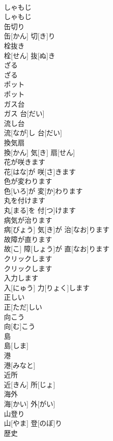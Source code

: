 \documentclass[8pt]{extreport}
\begin{document}
\begin{CJK}{UTF8}{min}
\\	しゃもじ	
\\	しゃもじ		
\\	缶切り	
\\	缶[かん] 切[き]り		
\\	栓抜き	
\\	栓[せん] 抜[ぬ]き		
\\	ざる	
\\	ざる		
\\	ポット	
\\	ポット		
\\	ガス台	
\\	ガス 台[だい]		
\\	流し台	
\\	流[なが]し 台[だい]		
\\	換気扇	
\\	換[かん] 気[き] 扇[せん]		
\\	花が咲きます	
\\	花[はな]が 咲[さ]きます		
\\	色が変わります	
\\	色[いろ]が 変[か]わります		
\\	丸を付けます	
\\	丸[まる]を 付[つ]けます		
\\	病気が治ります	
\\	病[びょう] 気[き]が 治[なお]ります		
\\	故障が直ります	
\\	故[こ] 障[しょう]が 直[なお]ります		
\\	クリックします	
\\	クリックします		
\\	入力します	
\\	入[にゅう] 力[りょく]します		
\\	正しい	
\\	正[ただ]しい		
\\	向こう	
\\	向[む]こう		
\\	島	
\\	島[しま]		
\\	港	
\\	港[みなと]		
\\	近所	
\\	近[きん] 所[じょ]		
\\	海外	
\\	海[かい] 外[がい]		
\\	山登り	
\\	山[やま] 登[のぼ]り		
\\	歴史	

\end{CJK}
\end{document}
